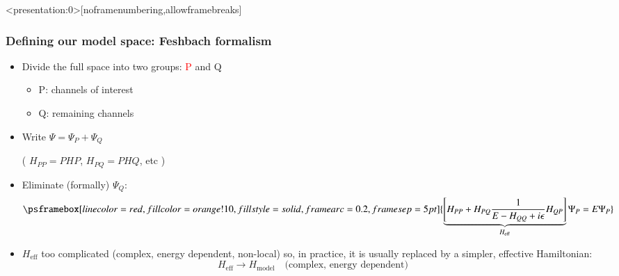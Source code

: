 \documentclass[english,10pt]{beamer}
\begin{document}
\begin{frame}<presentation:0>[noframenumbering,allowframebreaks]
\frametitle{Defining our model space: Feshbach formalism}

\begin{itemize}
\item Divide the full space into two groups: \textcolor{red}{P} and {\red Q}
\begin{itemize}
\item[\ding{233}] {\red P}: channels of interest
\item[\ding{233}] {\red Q}: remaining channels 
 \end{itemize}

\item  Write $\Psi = \Psi_P + \Psi_Q$

\begin{center}
\quad ( $H_{PP}=P H P $,  $H_{PQ}=P H Q $,  etc )
\end{center}

\item Eliminate (formally) $\Psi_Q$:
$$
\psframebox[linecolor=red,fillcolor=orange!10,fillstyle=solid,framearc=0.2,framesep=5pt]{
\underbrace{ \left [H_{PP} + H_{PQ} \frac{1}{E- H_{QQ} + i \epsilon} H_{QP}  \right ] }_{H_\mathrm{eff} } \Psi_P = E \Psi_P 
}%
$$

\item $H_\mathrm{eff}$ too complicated (complex, energy dependent, non-local) so, in practice, it is usually  replaced by a simpler, effective Hamiltonian: 
$$
H_\mathrm{eff} \longrightarrow H_\mathrm{model} \quad \textrm{(complex, energy dependent)}
$$ 

\end{itemize}
\end{frame}
\end{document}
